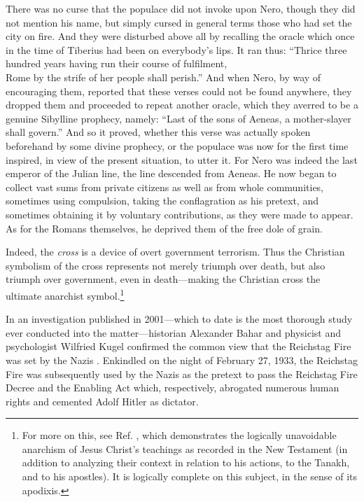\documentclass[letterpaper,12pt]{article}
\makeatletter
\newcommand{\asterism}{\smash{%
  \raisebox{-.5ex}{%
    \setlength{\tabcolsep}{-.5pt}%
    \begin{tabular}{@{}cc@{}}%
      \multicolumn2c*\\[-2ex]*&*%
    \end{tabular}}}}
\newenvironment{squotation}
  {\small\quotation}
  {\endquotation\normalsize}
\newenvironment{sverse}
  {\small\verse}
  {\endverse\normalsize}
\makeatother
\begin{document}
\begin{squotation}
There was no curse that the populace did not invoke upon Nero, though they did not mention his name, but simply cursed in general terms those who had set the city on fire. And they were disturbed above all by recalling the oracle which once in the time of Tiberius had been on everybody's lips. It ran thus: \begin{sverse}
``Thrice three hundred years having run their course of fulfilment,\\
Rome by the strife of her people shall perish.''
\end{sverse} And when Nero, by way of encouraging them, reported that these verses could not be found anywhere, they dropped them and proceeded to repeat another oracle, which they averred to be a genuine Sibylline prophecy, namely: \begin{sverse}
``Last of the sons of Aeneas, a mother-slayer shall govern.''
\end{sverse} And so it proved, whether this verse was actually spoken beforehand by some divine prophecy, or the populace was now for the first time inspired, in view of the present situation, to utter it. For Nero was indeed the last emperor of the Julian line, the line descended from Aeneas. He now began to collect vast sums from private citizens as well as from whole communities, sometimes using compulsion, taking the conflagration as his pretext, and sometimes obtaining it by voluntary contributions, as they were made to appear. As for the Romans themselves, he deprived them of the free dole of grain.
\end{squotation}

Indeed, the \emph{cross} is a device of overt government terrorism. Thus the Christian symbolism of the cross represents not merely triumph over death, but also triumph over government, even in death---making the Christian cross the ultimate anarchist symbol.\footnote{For more on this, see Ref. , which demonstrates the logically unavoidable anarchism of Jesus Christ's teachings as recorded in the New Testament (in addition to analyzing their context in relation to his actions, to the Tanakh, and to his apostles). It is logically complete on this subject, in the sense of its apodixis.}

\vspace{1em}
\centerline{\asterism}
\vspace{1em}

In an investigation published in 2001---which to date is the most thorough study ever conducted into the matter---historian Alexander Bahar and physicist and psychologist Wilfried Kugel confirmed the common view that the Reichstag Fire was set by the Nazis \cite{BaharKugel2001}. Enkindled on the night of February 27, 1933, the Reichstag Fire was subsequently used by the Nazis as the pretext to pass the Reichstag Fire Decree and the Enabling Act which, respectively, abrogated numerous human rights and cemented Adolf Hitler as dictator.
\end{document}
